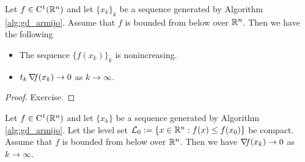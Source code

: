 \documentclass[10pt,a4paper]{article}
\begin{document}
\begin{theorem}\label{thm:Armijo_convergence}
	Let $f\in \mathord{\mathrm{C^1}}(\mathbb{R}^n)$ and let $\{x_k\}_k$ be a sequence generated by Algorithm \ref{alg:gd_armijo}. Assume that $f$ is bounded from below over $\mathbb{R}^n$. Then we have the following
	\begin{itemize}
		\item[(a)] The sequence $\{f(x_k)\}_k$ is nonincreasing. 
		\item[(b)] $t_k\operatorname*{\mathit{\nabla \!f}}(x_k) \to 0$ as $k\to \infty$.
	\end{itemize}
\end{theorem}
\begin{proof}
	Exercise.
\end{proof}
\begin{theorem}\label{thm:Armijo_convergence_p2}
	Let $f\in \mathord{\mathrm{C^1}}(\mathbb{R}^n)$ and let $\{x_k\}$ be a sequence generated by Algorithm \ref{alg:gd_armijo}. Let the level set $\mathcal{L}_0:=\{x\in \mathbb{R}^n: f(x)\leq f(x_0)\}$ be compact. Assume that $f$ is bounded from below over $\mathbb{R}^n$. Then we have $\operatorname*{\mathit{\nabla \!f}}(x_k) \to 0$ as $k\to \infty$.
\end{theorem}
\end{document}
